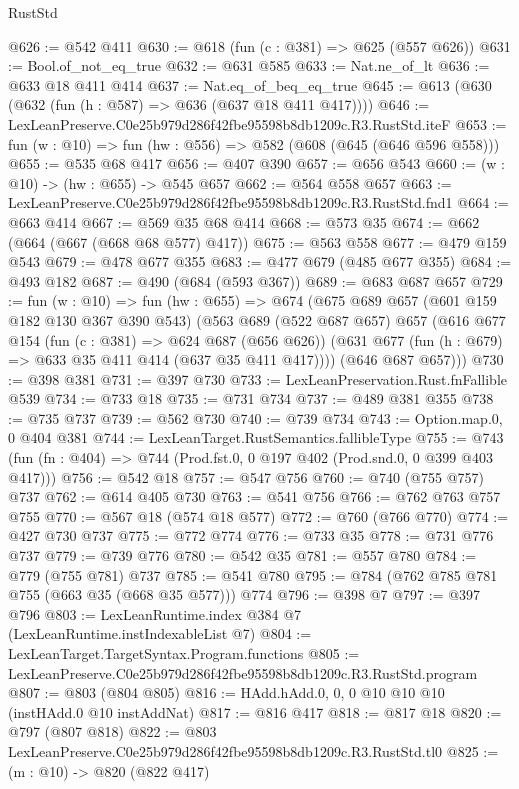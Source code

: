 \begin{lexlean}{RustStd}
\begin{coremodule}
@626 := @542 @411
@630 := @618 (fun (c : @381) => @625 (@557 @626))
@631 := Bool.of_not_eq_true
@632 := @631 @585
@633 := Nat.ne_of_lt
@636 := @633 @18 @411 @414
@637 := Nat.eq_of_beq_eq_true
@645 := @613 (@630 (@632 (fun (h : @587) => @636 (@637 @18 @411 @417))))
@646 := LexLeanPreserve.C0e25b979d286f42fbe95598b8db1209c.R3.RustStd.iteF
@653 := fun (w : @10) => fun (hw : @556) => @582 (@608 (@645 (@646 @596 @558)))
@655 := @535 @68 @417
@656 := @407 @390
@657 := @656 @543
@660 := (w : @10) -> (hw : @655) -> @545 @657
@662 := @564 @558 @657
@663 := LexLeanPreserve.C0e25b979d286f42fbe95598b8db1209c.R3.RustStd.fnd1
@664 := @663 @414
@667 := @569 @35 @68 @414
@668 := @573 @35
@674 := @662 (@664 (@667 (@668 @68 @577) @417))
@675 := @563 @558
@677 := @479 @159 @543
@679 := @478 @677 @355
@683 := @477 @679 (@485 @677 @355)
@684 := @493 @182
@687 := @490 (@684 (@593 @367))
@689 := @683 @687 @657
@729 := fun (w : @10) =>
  fun (hw : @655) =>
  @674
    (@675
      @689
      @657
      (@601 @159 @182 @130 @367 @390 @543)
      (@563
        @689
        (@522 @687 @657)
        @657
        (@616
          @677
          @154
          (fun (c : @381) => @624 @687 (@656 @626))
          (@631 @677 (fun (h : @679) => @633 @35 @411 @414 (@637 @35 @411 @417))))
        (@646 @687 @657)))
@730 := @398 @381
@731 := @397 @730
@733 := LexLeanPreservation.Rust.fnFallible @539
@734 := @733 @18
@735 := @731 @734
@737 := @489 @381 @355
@738 := @735 @737
@739 := @562 @730
@740 := @739 @734
@743 := Option.map.{0, 0} @404 @381
@744 := LexLeanTarget.RustSemantics.fallibleType
@755 := @743 (fun (fn : @404) => @744 (Prod.fst.{0, 0} @197 @402 (Prod.snd.{0, 0} @399 @403 @417)))
@756 := @542 @18
@757 := @547 @756
@760 := @740 (@755 @757) @737
@762 := @614 @405 @730
@763 := @541 @756
@766 := @762 @763 @757 @755
@770 := @567 @18 (@574 @18 @577)
@772 := @760 (@766 @770)
@774 := @427 @730 @737
@775 := @772 @774
@776 := @733 @35
@778 := @731 @776 @737
@779 := @739 @776
@780 := @542 @35
@781 := @557 @780
@784 := @779 (@755 @781) @737
@785 := @541 @780
@795 := @784 (@762 @785 @781 @755 (@663 @35 (@668 @35 @577))) @774
@796 := @398 @7
@797 := @397 @796
@803 := LexLeanRuntime.index @384 @7 (LexLeanRuntime.instIndexableList @7)
@804 := LexLeanTarget.TargetSyntax.Program.functions
@805 := LexLeanPreserve.C0e25b979d286f42fbe95598b8db1209c.R3.RustStd.program
@807 := @803 (@804 @805)
@816 := HAdd.hAdd.{0, 0, 0} @10 @10 @10 (instHAdd.{0} @10 instAddNat)
@817 := @816 @417
@818 := @817 @18
@820 := @797 (@807 @818)
@822 := @803 LexLeanPreserve.C0e25b979d286f42fbe95598b8db1209c.R3.RustStd.tl0
@825 := (m : @10) -> @820 (@822 @417)

\end{coremodule}
\end{lexlean}
